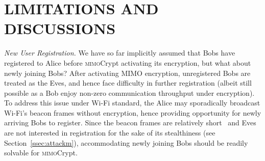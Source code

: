 \documentclass[conference,compsoc]{IEEEtran}
\newcommand{\sname}{\textsc{mimo}Crypt\xspace}
\newcommand{\newrev}[1]{{\color{blue}#1}}    %
\newcommand{\newrev}[1]{#1}
\begin{document}
\section{\MakeUppercase{Limitations and Discussions}} \label{sec:limfur}
%

\noindent\emph{New User Registration.} 
%
We have so far implicitly assumed that Bobs have registered to Alice before \sname activating its encryption, but what about newly joining Bobs? After activating MIMO encryption, unregistered Bobs are treated as the Eves, and hence face difficulty in further registration (albeit still possible as a Bob enjoy non-zero communication throughput under encryption). To address this issue under Wi-Fi standard, the Alice may sporadically broadcast Wi-Fi's beacon frames without encryption, hence providing opportunity for newly arriving Bobs to register. Since the beacon frames are relatively short~\cite{Beacon} and 
\newrev{Eves are not interested in registration for the sake of its stealthiness (see Section~\ref{ssec:attackm}),} accommodating newly joining Bobs should be readily solvable for \sname.

\end{document}
